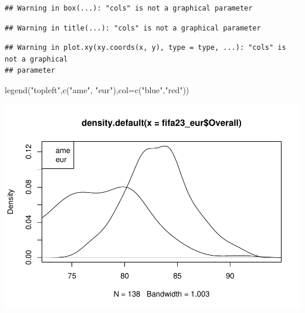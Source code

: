 \documentclass[
]{article}
\newenvironment{Shaded}{\begin{snugshade}}{\end{snugshade}}
\newcommand{\AttributeTok}[1]{\textcolor[rgb]{0.77,0.63,0.00}{#1}}
\newcommand{\FunctionTok}[1]{\textcolor[rgb]{0.00,0.00,0.00}{#1}}
\newcommand{\NormalTok}[1]{#1}
\newcommand{\SpecialCharTok}[1]{\textcolor[rgb]{0.00,0.00,0.00}{#1}}
\newcommand{\StringTok}[1]{\textcolor[rgb]{0.31,0.60,0.02}{#1}}
\begin{document}
\begin{verbatim}
## Warning in box(...): "cols" is not a graphical parameter
\end{verbatim}

\begin{verbatim}
## Warning in title(...): "cols" is not a graphical parameter
\end{verbatim}

\begin{Shaded}
\end{Shaded}

\begin{verbatim}
## Warning in plot.xy(xy.coords(x, y), type = type, ...): "cols" is not a graphical
## parameter
\end{verbatim}

\begin{Shaded}
\begin{Highlighting}[]
\FunctionTok{legend}\NormalTok{(}\StringTok{"topleft"}\NormalTok{,}\FunctionTok{c}\NormalTok{(}\StringTok{"ame"}\NormalTok{, }\StringTok{"eur"}\NormalTok{),}\AttributeTok{col=}\FunctionTok{c}\NormalTok{(}\StringTok{"blue"}\NormalTok{,}\StringTok{"red"}\NormalTok{))}
\end{Highlighting}
\end{Shaded}

\includegraphics{taller_evaluable1_ENUNCIADO_22_23_files/figure-latex/unnamed-chunk-9-1.pdf}
\end{document}
